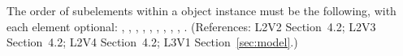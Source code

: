 The order of subelements within a \Model object instance must be the
following, with each element optional:
, ,
, ,
,
,
, , ,
.  (References: L2V2 Section~4.2; L2V3
Section~4.2; L2V4 Section~4.2; L3V1 Section~\ref{sec:model}.)
